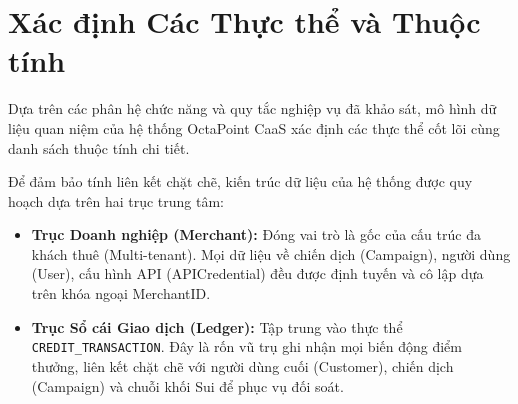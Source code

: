 \section{Xác định Các Thực thể và Thuộc tính}
Dựa trên các phân hệ chức năng và quy tắc nghiệp vụ đã khảo sát, mô hình dữ liệu quan niệm của hệ thống OctaPoint CaaS xác định các thực thể cốt lõi cùng danh sách thuộc tính chi tiết.

Để đảm bảo tính liên kết chặt chẽ, kiến trúc dữ liệu của hệ thống được quy hoạch dựa trên hai trục trung tâm:
\begin{itemize}
    \item \textbf{Trục Doanh nghiệp (Merchant):} Đóng vai trò là gốc của cấu trúc đa khách thuê (Multi-tenant). Mọi dữ liệu về chiến dịch (Campaign), người dùng (User), cấu hình API (APICredential) đều được định tuyến và cô lập dựa trên khóa ngoại MerchantID.
    \item \textbf{Trục Sổ cái Giao dịch (Ledger):} Tập trung vào thực thể \texttt{CREDIT\_TRANSACTION}. Đây là rốn vũ trụ ghi nhận mọi biến động điểm thưởng, liên kết chặt chẽ với người dùng cuối (Customer), chiến dịch (Campaign) và chuỗi khối Sui để phục vụ đối soát.
\end{itemize}

